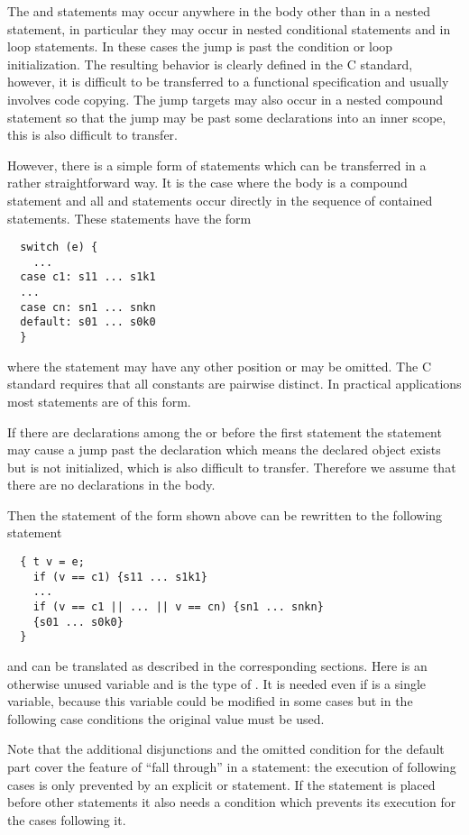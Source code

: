 The  and  statements may occur anywhere in the body other than in a nested  statement,
in particular they may occur in nested conditional statements and in loop statements. In these cases the jump is past the 
condition or loop initialization. The resulting behavior is clearly defined in the C standard, however, it is difficult to 
be transferred to a functional specification and usually involves code copying. The jump targets may also occur in a nested 
compound statement so that the jump may be past some declarations into an inner scope, this is also difficult to transfer.

However, there is a simple form of  statements which can be transferred in a rather straightforward way. It is
the case where the body is a compound statement and all  and  statements occur directly in the 
sequence of contained statements. These  statements have the form
\begin{verbatim}
  switch (e) {
    ...
  case c1: s11 ... s1k1
  ...
  case cn: sn1 ... snkn
  default: s01 ... s0k0
  }
\end{verbatim}
where the  statement may have any other position or may be omitted. The C standard requires that all 
constants are pairwise distinct. In practical applications most  statements are of this form. 

If there are declarations among the  or before the first  statement the  statement may cause
a jump past the declaration which means the declared object exists but is not initialized, which is also difficult to transfer.
Therefore we assume that there are no declarations in the body.

Then the  statement of the form shown above can be rewritten to the following statement
\begin{verbatim}
  { t v = e;
    if (v == c1) {s11 ... s1k1}
    ...
    if (v == c1 || ... || v == cn) {sn1 ... snkn}
    {s01 ... s0k0}
  }
\end{verbatim}
and can be translated as described in the corresponding sections. Here  is an otherwise unused variable and  is
the type of . It is needed even if  is a single variable, because this variable could be modified in some cases
but in the following case conditions the original value must be used.

Note that the additional disjunctions and the omitted condition for the default part cover the feature of ``fall through'' 
in a  statement: the execution of following cases is only prevented by an explicit  or 
statement. If the  statement is placed before other  statements it also needs a condition which prevents
its execution for the cases following it.

